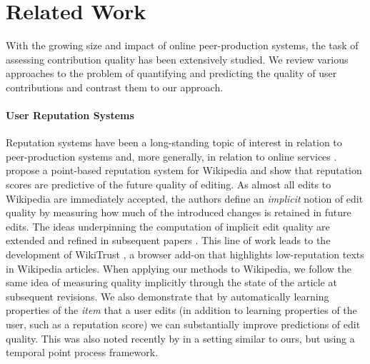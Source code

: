 \section{Related Work}
\label{pps:sec:relwork}

With the growing size and impact of online peer-production systems, the task of assessing contribution quality has been extensively studied.
We review various approaches to the problem of quantifying and predicting the quality of user contributions and contrast them to our approach.

\paragraph{User Reputation Systems}
Reputation systems have been a long-standing topic of interest in relation to peer-production systems and, more generally, in relation to online services \citep{resnick2000reputation}.
\citet{adler2007content} propose a point-based reputation system for Wikipedia and show that reputation scores are predictive of the future quality of editing.
As almost all edits to Wikipedia are immediately accepted, the authors define an \emph{implicit} notion of edit quality by measuring how much of the introduced changes is retained in future edits.
The ideas underpinning the computation of implicit edit quality are extended and refined in subsequent papers \citep{adler2008measuring, dealfaro2013content}.
This line of work leads to the development of WikiTrust \citep{dealfaro2011reputation}, a browser add-on that highlights low-reputation texts in Wikipedia articles.
When applying our methods to Wikipedia, we follow the same idea of measuring quality implicitly through the state of the article at subsequent revisions.
We also demonstrate that by automatically learning properties of the \emph{item} that a user edits (in addition to learning properties of the user, such as a reputation score) we can substantially improve predictions of edit quality.
This was also noted recently by \citet{tabibian2017distilling} in a setting similar to ours, but using a temporal point process framework.

